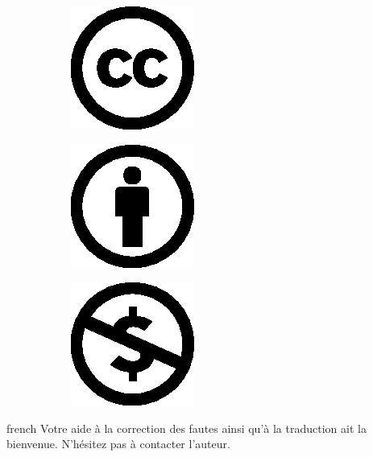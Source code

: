\documentclass[0_Main.tex]{subfiles}
\begin{document}
\begin{figure}[H]
\def\W{0.19}
\centering
\begin{subfigure}[b]{\W\columnwidth}
	\centering
	\includegraphics{pics/cc.eps}
\end{subfigure}
\begin{subfigure}[b]{\W\columnwidth}
	\centering
	\includegraphics{pics/by.eps}
\end{subfigure}
\begin{subfigure}[b]{\W\columnwidth}
	\centering
	\includegraphics{pics/nc.eps}
\end{subfigure}		
\end{figure}

\begin{shownto}{french}
Votre aide à la correction des fautes ainsi qu'à la traduction ait la bienvenue. N'hésitez pas à contacter l'auteur.
\end{shownto}
\end{document}
